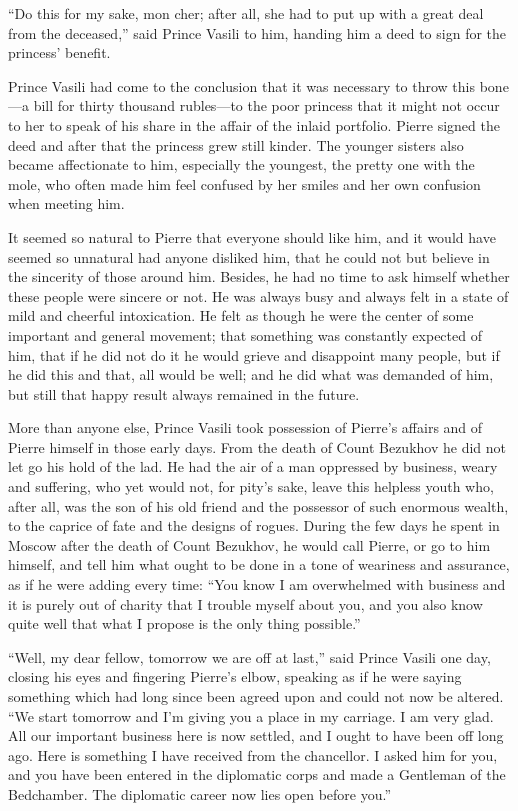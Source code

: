 ``Do this for my sake, mon cher; after all, she had to put up
with a great deal from the deceased,'' said Prince Vasili to him,
handing him a deed to sign for the princess' benefit.

Prince Vasili had come to the conclusion that it was necessary to
throw this bone---a bill for thirty thousand rubles---to the poor
princess that it might not occur to her to speak of his share in
the affair of the inlaid portfolio. Pierre signed the deed and
after that the princess grew still kinder. The younger sisters
also became affectionate to him, especially the youngest, the
pretty one with the mole, who often made him feel confused by her
smiles and her own confusion when meeting him.

It seemed so natural to Pierre that everyone should like him, and
it would have seemed so unnatural had anyone disliked him, that
he could not but believe in the sincerity of those around
him. Besides, he had no time to ask himself whether these people
were sincere or not. He was always busy and always felt in a
state of mild and cheerful intoxication. He felt as though he
were the center of some important and general movement; that
something was constantly expected of him, that if he did not do
it he would grieve and disappoint many people, but if he did this
and that, all would be well; and he did what was demanded of him,
but still that happy result always remained in the future.

More than anyone else, Prince Vasili took possession of Pierre's
affairs and of Pierre himself in those early days. From the death
of Count Bezukhov he did not let go his hold of the lad. He had
the air of a man oppressed by business, weary and suffering, who
yet would not, for pity's sake, leave this helpless youth who,
after all, was the son of his old friend and the possessor of
such enormous wealth, to the caprice of fate and the designs of
rogues. During the few days he spent in Moscow after the death of
Count Bezukhov, he would call Pierre, or go to him himself, and
tell him what ought to be done in a tone of weariness and
assurance, as if he were adding every time: ``You know I am
overwhelmed with business and it is purely out of charity that I
trouble myself about you, and you also know quite well that what
I propose is the only thing possible.''

``Well, my dear fellow, tomorrow we are off at last,'' said
Prince Vasili one day, closing his eyes and fingering Pierre's
elbow, speaking as if he were saying something which had long
since been agreed upon and could not now be altered. ``We start
tomorrow and I'm giving you a place in my carriage. I am very
glad. All our important business here is now settled, and I ought
to have been off long ago. Here is something I have received from
the chancellor. I asked him for you, and you have been entered in
the diplomatic corps and made a Gentleman of the Bedchamber.  The
diplomatic career now lies open before you.''

